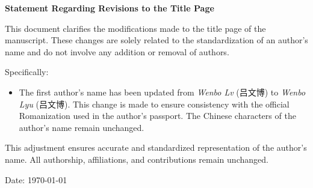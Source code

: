 \documentclass[12pt]{article}
\begin{document}
\begin{center}
    \textbf{\Large Statement Regarding Revisions to the Title Page}
\end{center}

\vspace{1em}

This document clarifies the modifications made to the title page of the manuscript. These changes are solely related to the standardization of an author's name and do not involve any addition or removal of authors.

Specifically:
\begin{itemize}
    \item The first author's name has been updated from \textit{Wenbo Lv} (吕文博) to \textit{Wenbo Lyu} (吕文博). This change is made to ensure consistency with the official Romanization used in the author's passport. The Chinese characters of the author's name remain unchanged.
\end{itemize}

This adjustment ensures accurate and standardized representation of the author's name. All authorship, affiliations, and contributions remain unchanged.

\vfill

\begin{flushright}
Date: \today \\
\end{flushright}
\end{document}
